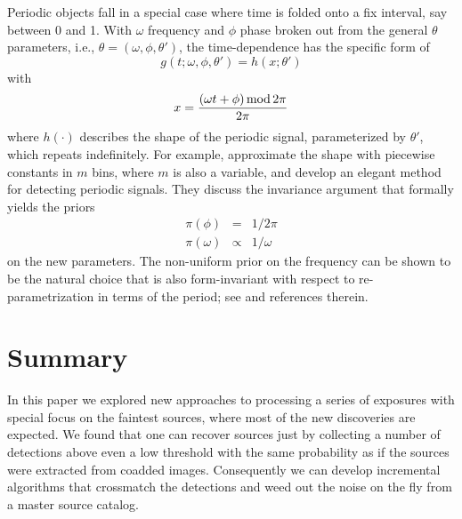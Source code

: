 \documentclass[twocolumn]{emulateapj}
\begin{document}
Periodic objects fall in a special case where time is folded onto a fix interval, say between 0 and 1. With $\omega$ frequency and $\phi$ phase broken out from the general $\theta$ parameters, i.e., \mbox{$\theta\!=\!(\omega,\phi,\theta')$}, the time-dependence has the specific form of
%
\begin{equation}
g(t;\omega,\phi,\theta') = h(x;\theta')
\end{equation}
with
\begin{equation}
x = \frac{ (\omega{}t+\phi)\,{\rm{}mod}\,{2\pi} }{2\pi}
\end{equation}
%
where $h(\cdot)$ describes the shape of the periodic signal, parameterized by $\theta'$, which repeats indefinitely.
%
For example, \citet{gregory} approximate the shape with piecewise constants in $m$ bins, where $m$ is also a variable, and develop an elegant method for detecting periodic signals.
%
They discuss the invariance argument that formally yields the priors
\begin{eqnarray}
\pi(\phi) & = & 1 \big/ 2\pi \\
\pi(\omega)& \propto & 1 \big/ \omega
\end{eqnarray}
on the new parameters.
%
The non-uniform prior on the frequency can be shown to be the natural choice that is also form-invariant with respect to re-parametrization in terms of the period; see \citet{gregory} and references therein.

\fi

\section{Summary}
\label{sec:sum}
\noindent
In this paper we explored new approaches to processing a series of exposures with special focus on the faintest sources, where most of the new discoveries are expected.
%
We found that one can recover sources just by collecting a number of detections above even a low threshold with the same probability as if the sources were extracted from coadded images. Consequently we can develop incremental algorithms that crossmatch the detections and weed out the noise on the fly from a master source catalog.
\end{document}
